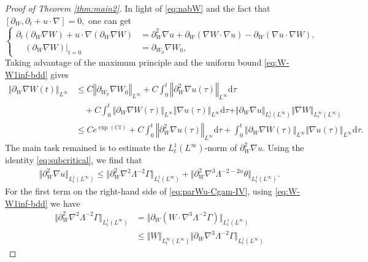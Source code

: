 \documentclass[reqno,11pt,a4paper]{amsart}
\newcommand{\dd}{\mathrm{d}}
\def \p {\partial}
\begin{document}
\begin{proof}[Proof of Theorem \ref{thm:main2}]
In light of \eqref{eq:nabW} and the fact that $[\p _W, \p _t+u\cdot\nabla]=0,$ one can get 
\begin{equation}\label{pWnaW}
\left\{
\begin{aligned}
  \partial_t (\p_W \nabla W) + u\cdot\nabla (\p_W\nabla W) 
  & =  \partial_W^2 \nabla u + \p_W(\nabla W \cdot \nabla u) - \p_W(\nabla u \cdot \nabla W), \\
  \quad (\p_W\nabla W)|_{t=0} & = \p_{W_0}\nabla W_0,
\end{aligned}
\right.
\end{equation}
Taking advantage of the maximum principle and the uniform bound \eqref{eq:W-W1inf-bdd} gives
\begin{equation}\label{eq:pWnabW-L}
\begin{aligned}
  \Vert \p_W \nabla W(t)\Vert _{L^\infty} & \leq C \left\Vert \p_{W_0}\nabla W_0\right\Vert _{L^\infty}
  + C \int_0^t\left\Vert \partial_W^2 \nabla u(\tau) \right\Vert _{L^\infty} \mathrm{d} \tau \\
  & \quad + C \int_0^t \Vert \p_W\nabla W(\tau)\Vert _{L^\infty} \Vert  \nabla u(\tau)\Vert _{L^\infty} \dd \tau
  + \Vert \p_W\nabla u\Vert _{L^1_t(L^\infty)} \Vert \nabla W\Vert _{L^\infty_t(L^\infty)}  \\
  & \leq C e^{\exp(Ct)} +  C \int_0^t\left\Vert \partial_W^2 \nabla u(\tau) \right\Vert _{L^\infty} \mathrm{d} \tau
  + \int_0^t \Vert \p_W\nabla W(\tau)\Vert _{L^\infty} \Vert  \nabla u(\tau)\Vert _{L^\infty} \dd \tau.
\end{aligned}
\end{equation}
The main task remained is to estimate the $L^1_t(L^\infty)$-norm of $\partial_W^2 \nabla u$. Using the identity 
\eqref{eq:subcritical}, we find that
\begin{align}\label{eq:parWu-Cgam-IV}
  \Vert \partial_W^2 \nabla u\Vert _{L^1_t (L^\infty)} 
  \leq \big\Vert \partial_W^2 \nabla^2 \Lambda^{-2} \Gamma\big\Vert _{L^1_t(L^\infty)}
  + \big\Vert \partial_W^2 \nabla^3\Lambda^{-2-2\alpha} \theta \big\Vert _{L^1_t(L^\infty)}.
\end{align}
For the first term on the right-hand side of \eqref{eq:parWu-Cgam-IV}, 
using  \eqref{eq:W-W1inf-bdd} we have
\begin{align*}
  \Vert \partial_W^2\nabla^2\Lambda^{-2}\Gamma\Vert _{L^1_t(L^\infty)}
  & = \Vert \p_W( W \cdot \nabla^3 \Lambda^{-2}\Gamma)\Vert _{L^1_t(L^\infty)} \\
  & \leq \Vert W\Vert _{L^\infty_t(L^\infty)} 
  \Vert \p_W \nabla^3\Lambda^{-2} \Gamma\Vert _{L^1_t(L^\infty)} 

\end{align*}
\end{proof}
\end{document}
